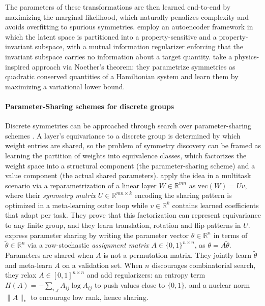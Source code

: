 \documentclass[mathematics,review,submit,moreauthors]{Definitions/mdpi}
\begin{document}
The parameters of these transformations are then learned end-to-end by maximizing the marginal likelihood, which naturally penalizes complexity and avoids overfitting to spurious symmetries.
\citet{wieser2020anips} employ an autoencoder framework in which the latent space is partitioned into a property-sensitive and a property-invariant subspace, with a mutual information regularizer enforcing that the invariant subspace carries no information about a target quantity.
\citet{ouderaa2024} take a physics-inspired approach via Noether's theorem: they parametrize symmetries as quadratic conserved quantities of a Hamiltonian system and learn them by maximizing a variational lower bound.

\paragraph{Parameter-Sharing schemes for discrete groups}
Discrete symmetries can be approached through search over parameter-sharing schemes \citep{zhou2021,yeh2022p2icais}.
A layer's equivariance to a discrete group is determined by which weight entries are shared, so the problem of symmetry discovery can be framed as learning the partition of weights into equivalence classes, which factorizes the weight space into a structural component (the parameter-sharing scheme) and a value component (the actual shared parameters).
\citet{zhou2021} apply the idea in a multitask scenario via a reparametrization of a linear layer $W\in \mathbb R^{mn}$ as $\mathrm{vec}(W) = Uv$, where their \emph{symmetry matrix} $U\in \mathbb R^{mn\times k}$ encoding the sharing pattern is optimized in a meta-learning outer loop while $v\in \mathbb R^k$ contains learned coefficients that adapt per task.
They prove that this factorization can represent equivariance to any finite group, and they learn translation, rotation and flip patterns in $U$.
\citet{yeh2022p2icais} express parameter sharing by writing the parameter vector $\theta\in \mathbb R^n$ in terms of $\tilde \theta\in \mathbb R^n$ via a row-stochastic \emph{assignment matrix} $A\in \{0,1\}^{n\times n}$, as $\theta=A \tilde \theta$.
Parameters are shared when $A$ is not a permutation matrix.
They jointly learn $\tilde \theta$ and meta-learn $A$ on a validation set.
When $n$ discourages combinatorial search, they relax $A\in [0,1]^{n\times n}$ and add regularizers: an entropy term $H(A) = -\sum_{i,j} A_{ij}\log A_{ij}$ to push values close to $\{0,1\}$, and a nuclear norm $\|A\|_*$ to encourage low rank, hence sharing.
\end{document}
